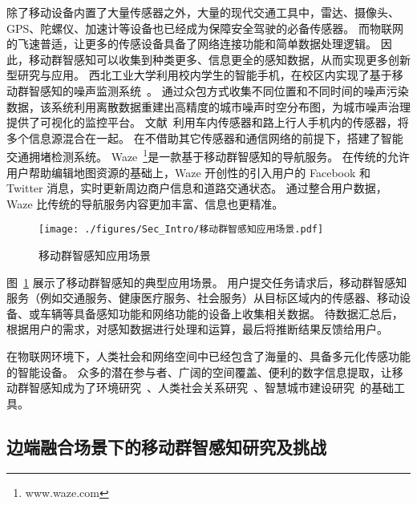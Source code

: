 除了移动设备内置了大量传感器之外，大量的现代交通工具中，雷达、摄像头、GPS、陀螺仪、加速计等设备也已经成为保障安全驾驶的必备传感器。
而物联网的飞速普适，让更多的传感设备具备了网络连接功能和简单数据处理逻辑。
因此，移动群智感知可以收集到种类更多、信息更全的感知数据，从而实现更多创新型研究与应用。
西北工业大学利用校内学生的智能手机，在校区内实现了基于移动群智感知的噪声监测系统~\cite{CNKI/2014/CSNSYu}。
通过众包方式收集不同位置和不同时间的噪声污染数据，该系统利用离散数据重建出高精度的城市噪声时空分布图，为城市噪声治理提供了可视化的监控平台。
文献~利用车内传感器和路上行人手机内的传感器，将多个信息源混合在一起。
在不借助其它传感器和通信网络的前提下，搭建了智能交通拥堵检测系统。
Waze~\footnote{www.waze.com}是一款基于移动群智感知的导航服务。
在传统的允许用户帮助编辑地图资源的基础上，Waze 开创性的引入用户的 Facebook 和 Twitter 消息，实时更新周边商户信息和道路交通状态。
通过整合用户数据，Waze 比传统的导航服务内容更加丰富、信息也更精准。

\begin{figure}[!h]
  \centering
  \texttt{[image: ./figures/Sec\_Intro/移动群智感知应用场景.pdf]}
  \vspace{-0.5em}
  \caption{移动群智感知应用场景}
  \vspace{-1em}
  \label{Figure_MCS_Application}
\end{figure}

图~\ref{Figure_MCS_Application} 展示了移动群智感知的典型应用场景。
用户提交任务请求后，移动群智感知服务（例如交通服务、健康医疗服务、社会服务）从目标区域内的传感器、移动设备、或车辆等具备感知功能和网络功能的设备上收集相关数据。
待数据汇总后，根据用户的需求，对感知数据进行处理和运算，最后将推断结果反馈给用户。

在物联网环境下，人类社会和网络空间中已经包含了海量的、具备多元化传感功能的智能设备。
众多的潜在参与者、广阔的空间覆盖、便利的数字信息提取，让移动群智感知成为了环境研究~\cite{DBLP:conf/sensys/DuttaAKMMWW09}、人类社会关系研究~\cite{DBLP:conf/globecom/AslIAM13}、智慧城市建设研究~\cite{DBLP:journals/cm/WangZWCHM16}的基础工具。

\subsection{边端融合场景下的移动群智感知研究及挑战}

